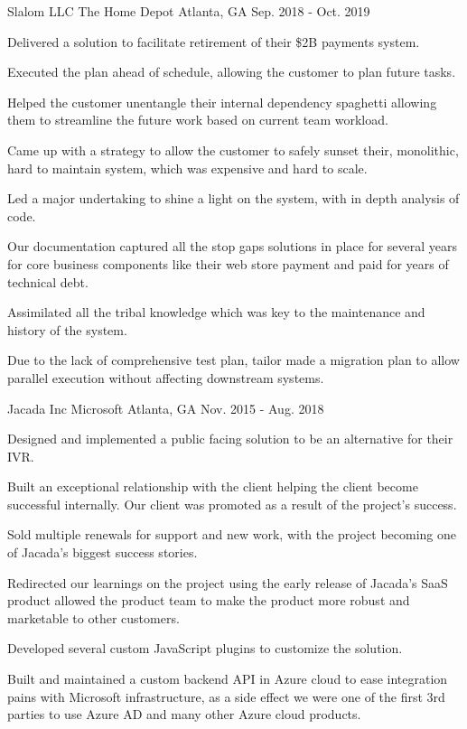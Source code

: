 \begin{cventries}
\cventry
{Slalom LLC} %
{The Home Depot} %
{Atlanta, GA} %
{Sep. 2018 - Oct. 2019} %
{
  \begin{cvitems} %
    \item {Delivered a solution to facilitate retirement of their \$2B payments system.}
    \item {Executed the plan ahead of schedule, allowing the customer to plan future tasks.}
    \item {Helped the customer unentangle their internal dependency spaghetti allowing them to streamline the future work based on current team workload.}
    \item {Came up with a strategy to allow the customer to safely sunset their, monolithic, hard to maintain system, which was expensive and hard to scale.}
    \item {Led a major undertaking to shine a light on the system, with in depth analysis of code.}
    \item {Our documentation captured all the stop gaps solutions in place for several years for core business components like their web store payment and paid for years of technical debt.}
    \item {Assimilated all the tribal knowledge which was key to the maintenance and history of the system.}
    \item {Due to the lack of comprehensive test plan, tailor made a migration plan to allow parallel execution without affecting downstream systems.}
  \end{cvitems}
}

\cventry
{Jacada Inc} %
{Microsoft} %
{Atlanta, GA} %
{Nov. 2015 - Aug. 2018} %
{
  \begin{cvitems} %
    \item {Designed and implemented a public facing solution to be an alternative for their IVR.}
    \item {Built an exceptional relationship with the client helping the client become successful internally. Our client was promoted as a result of the project's success.}
    \item {Sold multiple renewals for support and new work, with the project becoming one of Jacada’s biggest success stories.}
    \item {Redirected our learnings on the project using the early release of Jacada's SaaS product allowed the product team to make the product more robust and marketable to other customers.}
    \item {Developed several custom JavaScript plugins to customize the solution.}
    \item {Built and maintained a custom backend API in Azure cloud to ease integration pains with Microsoft infrastructure, as a side effect we were one of the first 3rd parties to use Azure AD and many other Azure cloud products.}
  \end{cvitems}
}


\end{cventries}
